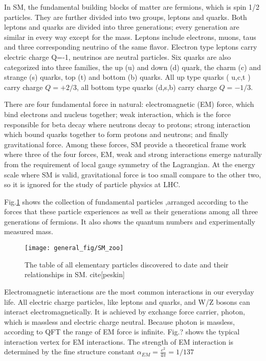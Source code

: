 In SM, the fundamental building blocks of matter are fermions, which is spin 1/2 particles. They are further divided into two groups, leptons and quarks. Both leptons and quarks are divided into three generations; every generation are similar in every way except for the mass. Leptons include electrons, muons, taus and three corresponding neutrino of the same flavor. Electron type leptons carry electric charge Q=-1, neutrinos are neutral particles. Six quarks are also categorized into three families, the up (u) and down (d) quark, the charm (c) and strange (s) quarks, top (t) and bottom (b) quarks. All up type quarks ( u,c,t ) carry charge $Q=+2/3$, all bottom type quarks (d,s,b) carry charge $Q=-1/3$.

There are four fundamental force in natural: electromagnetic (EM) force, which bind electrons and nucleus together; weak interaction, which is the force responsible for beta decay where neutrons decay to protons; strong interaction which bound quarks together to form protons and neutrons; and finally gravitational force. Among these forces, SM provide a theoretical frame work where three of the four forces, EM, weak and strong interactions emerge naturally from the requirement of local gauge symmetry of the Lagrangian. At the energy scale where SM is valid, gravitational force is too small compare to the other two, so it is ignored for the study of particle physics at LHC.

Fig.\ref{fig:SM_zoo} shows the collection of fundamental particles ,arranged according to the forces that these particle experiences as well as their generations among all three generations of fermions. It also shows the quantum numbers and experimentally measured mass.  

 \begin{figure}[hbt]
	\begin{center}
		\texttt{[image: general\_fig/SM\_zoo]}
		\caption{\small The table of all elementary particles discovered to date and their relationships in SM. cite[peskin]}
		\label{fig:SM_zoo}
	\end{center}
\end{figure}


Electromagnetic interactions are the most common interactions in our everyday life. All electric charge particles, like leptons and quarks, and W/Z bosons can interact electromagnetically. It is achieved by exchange force carrier, photon, which is massless and electric charge neutral. Because photon is massless, according to QFT the range of EM force is infinite. Fig.? shows the typical interaction vertex for EM interactions. The strength of EM interaction is determined by the fine structure constant $\alpha_{EM}=\frac{e^2}{4\pi}=1/137$

